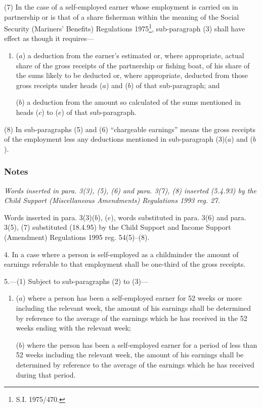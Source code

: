\documentclass[a4paper]{article}
\newcommand\amendment[1]{\subsubsection*{Notes}{\itshape\frenchspacing\footnotesize #1 \par\goodbreak}}
\begin{document}
(7) In the case of a self-employed earner whose employment is carried on in partnership or is that of a share fisherman within the meaning of the Social Security (Mariners' Benefits) Regulations 1975\footnote{\frenchspacing S.I. 1975/470.}, sub-paragraph (3) shall have effect as though it requires—
\begin{enumerate}\item[]
($a$) a deduction from the earner’s estimated or, where appropriate, actual share of the gross receipts of the partnership or fishing boat, of his share of the sums likely to be deducted or, where appropriate, deducted from those gross receipts under heads ($a$) and ($b$) of that sub-paragraph; and

($b$) a deduction from the amount so calculated of the sums mentioned in heads ($c$) to ($e$) of that sub-paragraph.
\end{enumerate}

(8) In sub-paragraphs (5) and (6) “chargeable earnings” means the gross receipts of the employment less any deductions mentioned in sub-paragraph (3)($a$) and ($b$).

\amendment{
Words inserted in para. 3(3), (5), (6) and para. 3(7), (8) inserted (5.4.93) by the Child Support (Miscellaneous Amendments) Regulations 1993 reg. 27.

Words inserted in para. 3(3)($b$), ($e$), words substituted in para. 3(6) and para. 3(5), (7) substituted (18.4.95) by the Child Support and Income Support (Amendment) Regulations 1995 reg. 54(5)--(8).
}

\medskip

4.  In a case where a person is self-employed as a childminder the amount of earnings referable to that employment shall be one-third of the gross receipts.

\medskip

5.—(1) Subject to sub-paragraphs 
(2) to (3)---  %
\begin{enumerate}\item[]
($a$) where a person has been a self-employed earner for 52 weeks or more including the relevant week, the amount of his earnings shall be determined by reference to the average of the earnings which he has received in the 52 weeks ending with the relevant week;

($b$) where the person has been a self-employed earner for a period of less than 52 weeks including the relevant week, the amount of his earnings shall be determined by reference to the average of the earnings which he has received during that period.
\end{enumerate}
\end{document}
